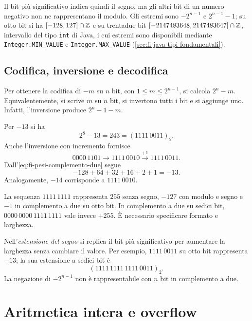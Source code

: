 Il bit più significativo indica quindi il segno, ma gli altri bit di
un numero negativo non ne rappresentano il modulo. Gli estremi
sono \(-2^{n-1}\) e \(2^{n-1}-1\); su otto bit si ha
\([-128,127]\cap\mathbb{Z}\) e su trentadue bit
\([-2147483648,2147483647]\cap\mathbb{Z}\), intervallo del tipo
\texttt{int} di Java, i cui estremi sono disponibili mediante
\texttt{Integer.MIN\_VALUE} e \texttt{Integer.MAX\_VALUE}
(\cref{sec:fi-java-tipi-fondamentali}).

\subsection{Codifica, inversione e decodifica}

Per ottenere la codifica di \(-m\) su \(n\) bit, con
\(1\le m\le2^{n-1}\), si calcola \(2^n-m\). Equivalentemente, si
scrive \(m\) su \(n\) bit, si invertono tutti i bit e si aggiunge uno.
Infatti, l'inversione produce \(2^n-1-m\).

\begin{example}
Per \(-13\) si ha
\[
  2^8-13=243=(1111\,0011)_2.
\]
Anche l'inversione con incremento fornisce
\[
  0000\,1101\longrightarrow1111\,0010
  \xrightarrow{+1}1111\,0011.
\]
Dall'\cref{eq:fi-pesi-complemento-due} segue
\[
  -128+64+32+16+2+1=-13.
\]
Analogamente, \(-14\) corrisponde a \(1111\,0010\).
\end{example}

\begin{warning}
\label{warn:fi-larghezza-interi}
La sequenza \(1111\,1111\) rappresenta \(255\) senza segno, \(-127\)
con modulo e segno e \(-1\) in complemento a due su otto bit. In
complemento a due su sedici bit, \(0000\,0000\,1111\,1111\) vale
invece \(+255\). È necessario specificare formato e larghezza.
\end{warning}

Nell'\emph{estensione del segno} si replica il bit più significativo
per aumentare la larghezza senza cambiare il valore. Per esempio,
\(1111\,0011\) su otto bit rappresenta \(-13\); la sua estensione
a sedici bit è
\[
  (1111\,1111\,1111\,0011)_2.
\]
La negazione di \(-2^{n-1}\) non è rappresentabile con \(n\)
bit in complemento a due.

\clearpage

\section{Aritmetica intera e overflow}
\label{sec:fi-aritmetica-overflow}

